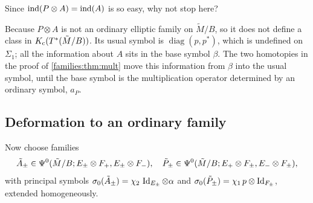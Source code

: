 \begin{question}
  Since $\operatorname{ind}(P\otimes A)=\operatorname{ind}(A)$ is so easy, why not stop here?
\end{question}
\begin{answer}
  Because $P\otimes A$ is not an ordinary elliptic family on $\tilde M/B$, so it
  does not define a class in $K_{\mathrm{c}}(T^*(\tilde M/B))$. Its usual symbol is
  $\operatorname{diag}(p,p^*)$, which is undefined on $\Sigma_1$; all the
  information about $A$ sits in the base symbol $\beta$. The two homotopies in
  the proof of \cref{families:thm:mult} move this information from $\beta$ into
  the usual symbol, until the base symbol is the multiplication operator
  determined by an ordinary symbol, $a_P$.
\end{answer}

\subsection{Deformation to an ordinary family}
Now choose families
\begin{equation*}
  \tilde A_\pm\in\Psi^{0}(\tilde M/B;E_\pm\otimes F_+,E_\pm\otimes F_-),\quad
  \tilde P_\pm\in\Psi^{0}(\tilde M/B;E_+\otimes F_\pm,E_-\otimes F_\pm),
\end{equation*}
with principal symbols $\sigma_0(\tilde A_\pm)=\chi_2\,\operatorname{Id}_{E_\pm}\otimes\alpha$
and $\sigma_0(\tilde P_\pm)=\chi_1\,p\otimes\operatorname{Id}_{F_\pm}$, extended
homogeneously.

